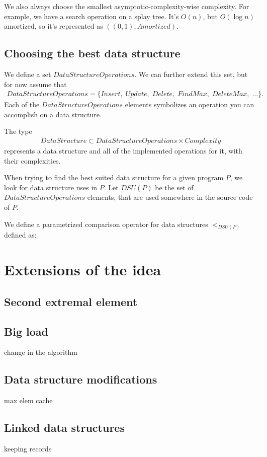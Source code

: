 \documentclass[11pt]{article}
\begin{document}
		We also always choose the smallest asymptotic-complexity-wise complexity. For example, we have a search operation on a splay tree. It's $O(n)$, but $O(\log n)$ amortized, so it's represented as $((0,1),Amortized)$.
	\subsection{Choosing the best data structure}
		We define a set $DataStructureOperations$. We can further extend this set, but for now assume that
		\begin{eqnarray}
		  	DataStructureOperations = \{Insert, \; Update, \; Delete, \; FindMax,\; DeleteMax, \; \dots\}.
		\end{eqnarray}
		Each of the $DataStructureOperations$ elements symbolizes an operation you can accomplish on a data structure.

		The type 
		\begin{eqnarray}
			DataStructure \subset DataStructureOperations \times Complexity
		\end{eqnarray}
		represents a data structure and all of the implemented operations for it, with their complexities.

		When trying to find the best suited data structure for a given program $P$, we look for data structure uses in $P$. Let $DSU(P)$ be the set of $DataStructureOperations$ elements, that are used somewhere in the source code of $P$.

		We define a parametrized comparison operator for data structures $<_{DSU(P)}$ defined as:


\section{Extensions of the idea}
	\subsection{Second extremal element}
	\subsection{Big load}
		change in the algorithm
	\subsection{Data structure modifications}
		max elem cache
	\subsection{Linked data structures}
		keeping records
\end{document}
